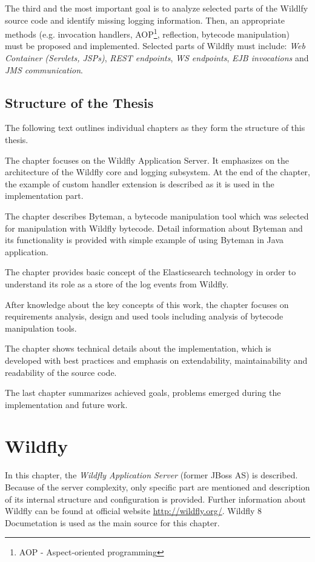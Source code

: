 \documentclass[12pt,oneside]{fithesis2}
\begin{document}
The third and the most important goal is to analyze selected parts of the Wildlfy source code and identify missing logging information. Then, an appropriate methods (e.g. invocation handlers, AOP\footnote{AOP - Aspect-oriented programming}, reflection, bytecode manipulation) must be proposed and implemented. Selected parts of Wildfly must include: \textit{Web Container (Servlets, JSPs)}, \textit{REST endpoints}, \textit{WS endpoints}, \textit{EJB invocations} and \textit{JMS communication}.

\section{Structure of the Thesis}
The following text outlines individual chapters as they form the structure of this thesis.

The chapter  focuses on the Wildfly Application Server. It emphasizes on the architecture of the Wildfly core and logging subsystem. At the end of the chapter, the example of custom handler extension is described as it is used in the implementation part.

The chapter  describes Byteman, a bytecode manipulation tool which was selected for manipulation with Wildfly bytecode. Detail information about Byteman and its functionality is provided with simple example of using Byteman in Java application.

The  chapter provides basic concept of the Elasticsearch technology in order to understand its role as a store of the log events from Wildfly.

After knowledge about the key concepts of this work, the chapter  focuses on requirements analysis, design and used tools including analysis of bytecode manipulation tools.

The chapter  shows technical details about the implementation, which is developed with best practices and emphasis on extendability, maintainability and readability of the source code.

The last chapter  summarizes achieved goals, problems emerged during the implementation and future work.
    
	    
\chapter{Wildfly}
\label{wildfly_chapter}
In this chapter, the \textit{Wildfly Application Server} (former JBoss AS) is described. Because of the server complexity, only specific part are mentioned and description of its internal structure and configuration is provided. Further information about Wildfly can be found at official website \url{http://wildfly.org/}. Wildfly 8 Documetation \cite{wildfly_doc} is used as the main source for this chapter.
\end{document}
